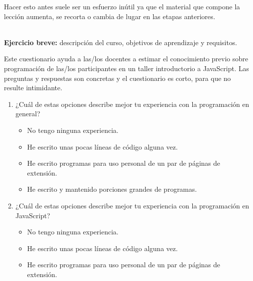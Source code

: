 Hacer esto antes suele ser un esfuerzo inútil
ya que el material que compone la lección aumenta, se recorta o cambia de lugar en las etapas anteriores.

~\\
\noindent
\textbf{Ejercicio breve:}
descripción del curso,
objetivos de aprendizaje
y requisitos.


Este cuestionario ayuda a las/los docentes a estimar el conocimiento previo sobre programación
de las/los participantes en un taller introductorio a JavaScript.
Las preguntas y respuestas son concretas
y el cuestionario es corto, para que no resulte intimidante.

\begin{enumerate}

\item
  ¿Cuál de estas opciones describe mejor
  tu experiencia con la programación en general?

  \begin{itemize}
    
  \item
    No tengo ninguna experiencia.
    
  \item
    He escrito unas pocas líneas de código alguna vez.
    
  \item
    He escrito programas para uso personal de un par de páginas de extensión.
    
  \item
    He escrito y mantenido porciones grandes de programas.\\
    
  \end{itemize}

\item
  ¿Cuál de estas opciones describe mejor
  tu experiencia con la programación en JavaScript?

  \begin{itemize}
    
  \item
    No tengo ninguna experiencia.
    
  \item
    He escrito unas pocas líneas de código alguna vez.
    
  \item
    He escrito programas para uso personal de un par de páginas de extensión.
    

\end{itemize}
\end{enumerate}
